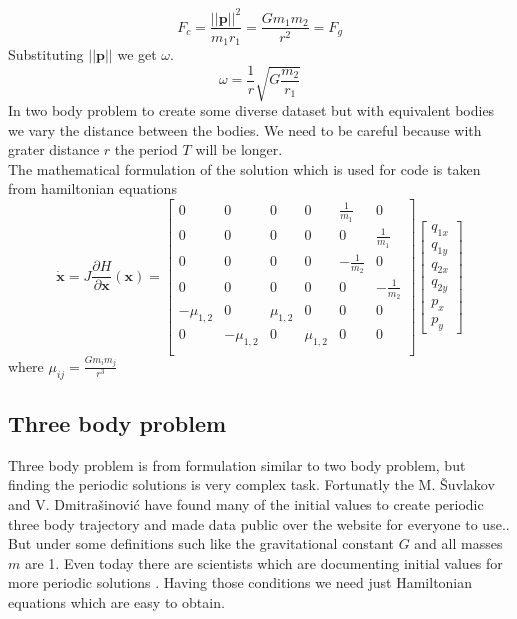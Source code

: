 \begin{equation}
	F_c = \frac{||\mathbf{p}||^2}{m_1r_1} = \frac{Gm_1m_2}{r^2} = F_g
\end{equation}
Substituting $||\mathbf{p}||$ we get $\omega$.
\begin{equation}
	\omega = \frac{1}{r}\sqrt{G\frac{m_2}{r_1}}
\end{equation}
In two body problem to create some diverse dataset but with equivalent bodies we vary the distance between the bodies. We need to be careful because with grater distance $r$ the period $T$ will be longer.\\
The mathematical formulation of the solution which is used for code is taken from hamiltonian equations
\begin{equation}
	\dot{\mathbf{x}} = J\frac{\partial H}{\partial \mathbf{x}}(\mathbf{x})=
\begin{bmatrix}
	0 & 0 & 0 & 0 & \frac{1}{m_1} & 0\\
	0 & 0 & 0 & 0 & 0 & \frac{1}{m_1}\\
	0 & 0 & 0 & 0 & -\frac{1}{m_2} & 0\\
	0 & 0 & 0 & 0 & 0 & -\frac{1}{m_2}\\
	-\mu_{1,2} & 0 & \mu_{1,2} & 0 & 0 & 0 \\
	0 & -\mu_{1,2} & 0 & \mu_{1,2} & 0 & 0 \\
\end{bmatrix}
\begin{bmatrix}
	q_{1x}\\
	q_{1y}\\
	q_{2x}\\
	q_{2y}\\
	p_x\\
	p_y
\end{bmatrix} 
\end{equation} where $\mu_{ij}=\frac{Gm_im_j}{r^3}$ 

\subsection{Three body problem}
Three body problem is from formulation similar to two body problem, but finding the periodic solutions is very complex task. Fortunatly the M. Šuvlakov and V. Dmitrašinović have found many of the initial values to create periodic three body trajectory and made data public over the website for everyone to use.\cite{papthreebody}\cite{web}. But under some definitions such like the gravitational constant $G$ and all masses $m$ are 1.
Even today there are scientists which are documenting initial values for more periodic solutions \cite{hudomal2015new}.
Having those conditions we need just Hamiltonian equations which are easy to obtain. 

